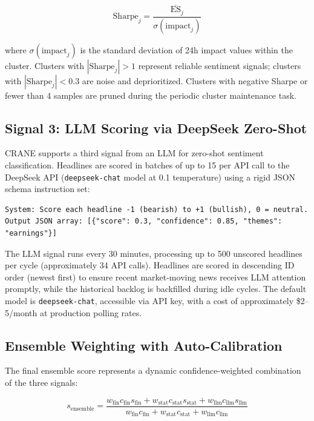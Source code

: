 \begin{equation}
\text{Sharpe}_j = \frac{\overline{\text{ES}}_j}{\sigma(\text{impact}_j)}
\label{eq:sharpe}
\end{equation}

where $\sigma(\text{impact}_j)$ is the standard deviation of 24h impact values within the cluster. Clusters with $|\text{Sharpe}_j| > 1$ represent reliable sentiment signals; clusters with $|\text{Sharpe}_j| < 0.3$ are noise and deprioritized. Clusters with negative Sharpe or fewer than 4 samples are pruned during the periodic cluster maintenance task.

\subsection{Signal 3: LLM Scoring via DeepSeek Zero-Shot}

CRANE supports a third signal from an LLM for zero-shot sentiment classification. Headlines are scored in batches of up to 15 per API call to the DeepSeek API (\texttt{deepseek-chat} model at 0.1 temperature) using a rigid JSON schema instruction set:

\begin{lstlisting}[style=pythonstyle]
System: Score each headline -1 (bearish) to +1 (bullish), 0 = neutral.
Output JSON array: [{"score": 0.3, "confidence": 0.85, "themes": "earnings"}]
\end{lstlisting}

The LLM signal runs every 30 minutes, processing up to 500 unscored headlines per cycle (approximately 34 API calls). Headlines are scored in descending ID order (newest first) to ensure recent market-moving news receives LLM attention promptly, while the historical backlog is backfilled during idle cycles. The default model is \texttt{deepseek-chat}, accessible via API key, with a cost of approximately \$2--5/month at production polling rates.

\subsection{Ensemble Weighting with Auto-Calibration}

The final ensemble score represents a dynamic confidence-weighted combination of the three signals:

\begin{equation}
s_{\text{ensemble}} = \frac{w_{\text{fin}} c_{\text{fin}} s_{\text{fin}} + w_{\text{stat}} c_{\text{stat}} s_{\text{stat}} + w_{\text{llm}} c_{\text{llm}} s_{\text{llm}}}
{w_{\text{fin}} c_{\text{fin}} + w_{\text{stat}} c_{\text{stat}} + w_{\text{llm}} c_{\text{llm}}}
\label{eq:ensemble}
\end{equation}

